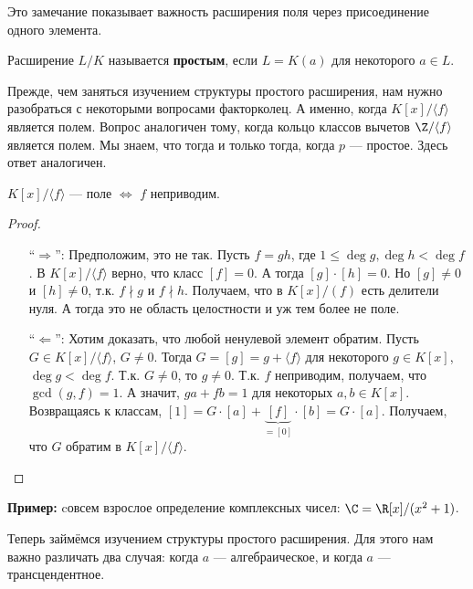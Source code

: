 Это замечание показывает важность расширения поля через присоединение одного элемента.

\begin{conj}
    Расширение $L / K$ называется \textbf{простым}, если $L = K(a)$ для некоторого $a \in L$.
\end{conj}

Прежде, чем заняться изучением структуры простого расширения, нам нужно разобраться с некоторыми вопросами факторколец. А именно, когда $K[x] / \langle f \rangle$ является полем. Вопрос аналогичен тому, когда кольцо классов вычетов $\Z / \langle f \rangle$ является полем. Мы знаем, что тогда и только тогда, когда $p$ --- простое. Здесь ответ аналогичен.

\begin{lemma}
    $K[x] / \langle f \rangle$ --- поле $\Longleftrightarrow$ $f$ неприводим.
\end{lemma}
\begin{proof} $ $

    \begin{itemize}
        \item[``$\Longrightarrow$'':] Предположим, это не так. Пусть $f = gh$, где $1 \leqslant \deg g, \deg h < \deg f$. В $K[x]/\langle f \rangle$ верно, что класс $[f] = 0$. А тогда $[g] \cdot [h] = 0$. Но $[g] \neq 0$ и $[h] \neq 0$, т.к. $f \nmid g$ и $f \nmid h$. Получаем, что в $K[x]/(f)$ есть делители нуля. А тогда это не область целостности и уж тем более не поле.

        \item[``$\Longleftarrow$'':] Хотим доказать, что любой ненулевой элемент обратим. Пусть $G \in K[x] / \langle f \rangle$, $G \neq 0$. Тогда $G = [g] = g + \langle f \rangle$ для некоторого $g \in K[x]$, $\deg g < \deg f$. Т.к. $G \neq 0$, то $g \neq 0$. Т.к. $f$ неприводим, получаем, что $\gcd(g, f) = 1$. А значит, $ga + fb = 1$ для некоторых $a, b \in K[x]$. Возвращаясь к классам, $[1] = G \cdot [a] + \underbrace{[f]}_{=[0]} \cdot [b] = G \cdot [a]$. Получаем, что $G$ обратим в $K[x] / \langle f \rangle$.
    \end{itemize}
\end{proof}

\textbf{Пример:} cовсем взрослое определение комплексных чисел: $\C = \R[x] / (x^2 + 1)$. 

Теперь займёмся изучением структуры простого расширения. Для этого нам важно различать два случая: когда $a$ --- алгебраическое, и когда $a$ --- трансцендентное.

